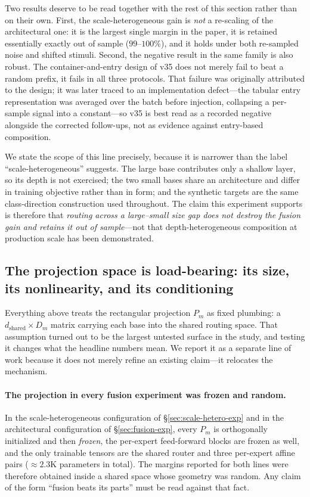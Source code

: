 \documentclass[10pt]{article}
\theoremstyle{definition}
\theoremstyle{plain}
\theoremstyle{remark}
\begin{document}
Two results deserve to be read together with the rest of this section rather than on their own.
First, the scale-heterogeneous gain is \emph{not} a re-scaling of the architectural one: it is the
largest single margin in the paper, it is retained essentially exactly out of sample
($99$--$100\%$), and it holds under both re-sampled noise and shifted stimuli. Second, the negative
result in the same family is also robust. The container-and-entry design of v35 does not merely fail
to beat a random prefix, it fails in all three protocols. That failure was originally attributed to
the design; it was later traced to an implementation defect---the tabular entry representation was
averaged over the batch before injection, collapsing a per-sample signal into a constant---so v35 is
best read as a recorded negative alongside the corrected follow-ups, not as evidence against
entry-based composition.

We state the scope of this line precisely, because it is narrower than the label
``scale-heterogeneous'' suggests. The large base contributes only a shallow layer, so its depth is
not exercised; the two small bases share an architecture and differ in training objective rather than
in form; and the synthetic targets are the same class-direction construction used throughout. The
claim this experiment supports is therefore that \emph{routing across a large--small size gap does not
destroy the fusion gain and retains it out of sample}---not that depth-heterogeneous composition at
production scale has been demonstrated.

\subsection{The projection space is load-bearing: its size, its nonlinearity, and its conditioning}
\label{sec:projection-space}

Everything above treats the rectangular projection $P_m$ as fixed plumbing: a
$d_{\text{shared}}\times D_m$ matrix carrying each base into the shared routing space. That
assumption turned out to be the largest untested surface in the study, and testing it changes what
the headline numbers mean. We report it as a separate line of work because it does not merely
refine an existing claim---it relocates the mechanism.

\paragraph{The projection in every fusion experiment was frozen and random.}
In the scale-heterogeneous configuration of \S\ref{sec:scale-hetero-exp} and in the
architectural configuration of \S\ref{sec:fusion-exp}, every $P_m$ is orthogonally initialized and
then \emph{frozen}, the per-expert feed-forward blocks are frozen as well, and the only trainable
tensors are the shared router and three per-expert affine pairs ($\approx 2.3$K parameters in
total). The margins reported for both lines were therefore obtained inside a shared space whose
geometry was random. Any claim of the form ``fusion beats its parts'' must be read against that
fact.
\end{document}
